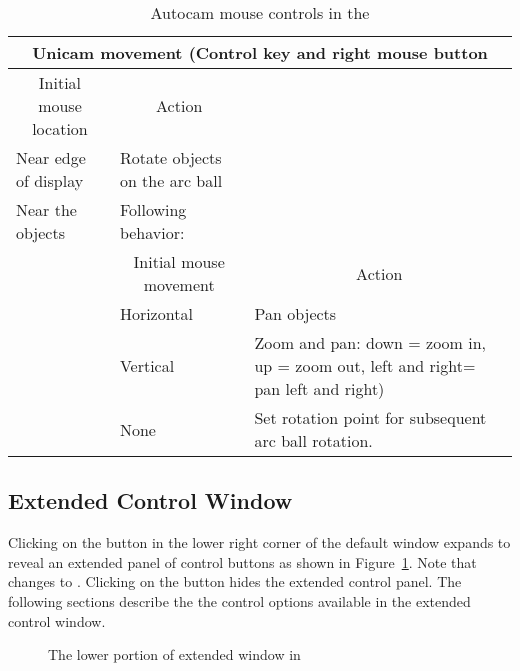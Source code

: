 \begin{table}
\begin{center}
\begin{tabular}{|l|l|p{3in}|} \hline
    \multicolumn{3}{|c|}{\large Unicam movement (Control key and right mouse
    button} \\ \hline \hline
    \multicolumn{1}{|c|}{Initial mouse location} & 
    \multicolumn{1}{|c|}{Action} & \\ 
    \hline
    Near edge of display & Rotate objects on the arc ball & \\
    Near the objects & Following behavior: & \\
    \hline
    & \multicolumn{1}{|c|}{Initial mouse movement} & 
    \multicolumn{1}{|c|}{Action}\\ \hline
    & Horizontal & Pan objects \\ 
    & Vertical & Zoom and pan: down = zoom in, up = zoom
    out, left and right= pan left and right) \\
    & None & Set rotation point for subsequent arc ball rotation.\\
    \hline
\end{tabular}
\caption{\label{tab:view-unicam} Autocam mouse controls in the \viewer{}}
\end{center}
\end{table}



\subsection{Extended Control Window}
\label{sec:view-control} 

Clicking on the \button{[+]} button in the lower right corner of the
default \viewer{} window expands to reveal an extended panel of
control buttons as shown in Figure~\ref{fig:extviewwindow}.  Note that
\button{[+]} changes to \button{[-]}.  Clicking on the \button{[-]}
button hides the extended control panel.  The following sections
describe the the control options available in the extended control
window.

\begin{figure}[htb]
  \begin{makeimage}
  \end{makeimage}
  \extendedwindow
  \caption{\label{fig:extviewwindow} The lower portion of extended
    \viewer{} window in \SR{}} 
\end{figure}


